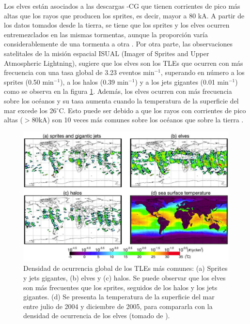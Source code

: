 \documentclass[12pt,oneside,openany,letter]{book}
\begin{document}
Los elves están asociados a las descargas -CG que tienen corrientes de pico más altas que los rayos que producen los sprites, es decir, mayor a 80 kA. A partir de los datos tomados desde la tierra, se tiene que los sprites y los elves ocurren entremezclados en las mismas tormentas, aunque la proporción varía considerablemente de una tormenta a otra \cite{FullekrugEtal2006}. Por otra parte, las observaciones satelitales de la misi\'on espacial ISUAL (Imager of Sprites and Upper Atmospheric Lightning), sugiere que los elves son los TLEs que ocurren con m\'as frecuencia con una tasa global de 3.23 eventos min$^{-1}$, superando en número a los sprites (0.50 min$^{-1}$), a los halos (0.39 min$^{-1}$) y a los jets gigantes (0.01 min$^{-1}$) \cite{chen2008} como se observa en la figura \ref{fig:TLE_global_rate}. Además, los elves ocurren con más frecuencia sobre los océanos y su tasa aumenta cuando la temperatura de la superficie del mar excede los 26$^{\circ}$C. Esto puede ser debido a que los rayos con corrientes de pico altas ($>80$kA) son 10 veces más comunes sobre los océanos que sobre la tierra \cite{chen2008}. 

\begin{figure}
    \centering
    \includegraphics[scale=0.33]{figures/TLE_global_rate.png}
    \caption{Densidad de ocurrencia global de los TLEs m\'as comunes: (a) Sprites y jets gigantes, (b) elves y (c) halos. Se puede observar que los elves son m\'as frecuentes que los sprites, seguidos de los halos y los jets gigantes. (d) Se presenta la temperatura de la superficie del mar entre julio de 2004 y diciembre de 2005, para compararla con la densidad de ocurrencia de los elves (tomado de \cite{chen2008}).}
    \label{fig:TLE_global_rate}
\end{figure}
\end{document}
